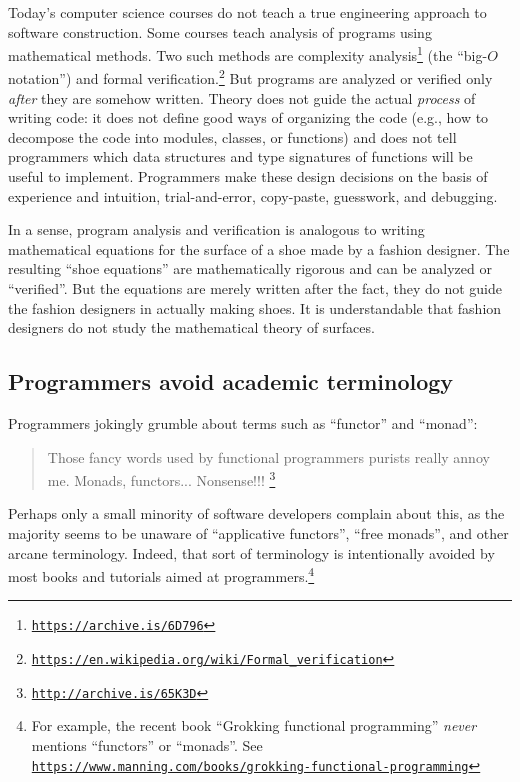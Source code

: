 Today\textsf{'}s computer science courses do not teach a true engineering approach
to software construction. Some courses teach analysis of programs
using mathematical methods. Two such methods are complexity analysis\footnote{\texttt{\href{https://www.cs.cmu.edu/~adamchik/15-121/lectures/Algorithmic\%20Complexity/complexity.html}{https://archive.is/6D796}}}
(the \textsf{``}big-$O$ notation\textsf{''}) and formal verification.\footnote{\texttt{\href{https://en.wikipedia.org/wiki/Formal_verification}{https://en.wikipedia.org/wiki/Formal\_verification}}}
But programs are analyzed or verified only \emph{after} they are somehow
written. Theory does not guide the actual \emph{process} of writing
code: it does not define good ways of organizing the code (e.g., how
to decompose the code into modules, classes, or functions) and does
not tell programmers which data structures and type signatures of
functions will be useful to implement. Programmers make these design
decisions on the basis of experience and intuition, trial-and-error,
copy-paste, guesswork, and debugging. 

In a sense, program analysis and verification is analogous to writing
mathematical equations for the surface of a shoe made by a fashion
designer. The resulting \textsf{``}shoe equations\textsf{''} are mathematically rigorous
and can be analyzed or \textsf{``}verified\textsf{''}. But the equations are merely
written after the fact, they do not guide the fashion designers in
actually making shoes. It is understandable that fashion designers
do not study the mathematical theory of surfaces.

\subsection*{Programmers avoid academic terminology }

Programmers jokingly grumble about terms such as \textsf{``}functor\textsf{''} and
\textsf{``}monad\textsf{''}:
\begin{quote}
{\small{}Those fancy words used by functional programmers purists
really annoy me. Monads, functors... Nonsense!!! }\footnote{\texttt{\href{http://archive.is/65K3D}{http://archive.is/65K3D}}}
\end{quote}
Perhaps only a small minority of software developers complain about
this, as the majority seems to be unaware of \textsf{``}applicative functors\textsf{''},
\textsf{``}free monads\textsf{''}, and other arcane terminology. Indeed, that sort
of terminology is intentionally avoided by most books and tutorials
aimed at programmers.\footnote{For example, the recent book \textsf{``}Grokking functional programming\textsf{''}
\emph{never} mentions \textsf{``}functors\textsf{''} or \textsf{``}monads\textsf{''}. See \texttt{\href{https://www.manning.com/books/grokking-functional-programming}{https://www.manning.com/books/grokking-functional-programming}}}

